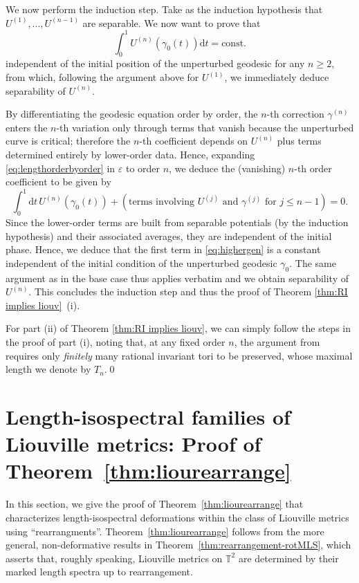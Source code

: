 \documentclass[11pt,letterpaper,oneside]{amsart}
\newcommand{\T}{\mathbb{T}}
\theoremstyle{definition}
\theoremstyle{remark}
\newcommand{\eps}{\varepsilon}
\newcommand{\const}{\text{const.}}
\theoremstyle{definition}
\theoremstyle{remark}
\newcommand{\dif}{\mathrm{d}}
\begin{document}
\medskip

We now perform the induction step. Take as the induction hypothesis that $U^{(1)}, ... , U^{(n-1)}$ are separable. We now want to prove that 
\begin{equation}     \label{eq:cancel}
   \int_0^1 U^{(n)}(\gamma_0(t)) \dif t = \const
\end{equation}
independent of the initial position of the unperturbed geodesic for any $n \ge 2$, from which, following the argument above for $U^{(1)}$, we immediately deduce separability of $U^{(n)}$.

\medskip

By differentiating the geodesic equation order by order, the $n$-th correction $\gamma^{(n)}$ enters the $n$-th variation only through terms that vanish because the unperturbed curve is critical; therefore the $n$-th coefficient depends on $U^{(n)}$
  plus terms determined entirely by lower-order data.
Hence, expanding \eqref{eq:lengthorderbyorder} in $\eps$ to order $n$, we deduce the (vanishing) $n$-th order coefficient to be given by
\begin{equation} \label{eq:highergen}
    \int_0^1 \dif t \, U^{(n)}(\gamma_0(t)) + (\text{terms involving } U^{(j)} \text{ and } \gamma^{(j)} \text{ for } j \le n-1)= 0. 
\end{equation}
Since the lower-order terms are built from separable potentials (by the induction hypothesis) and their associated averages, they are independent of the initial phase. Hence, we deduce that the first term in \eqref{eq:highergen} is a constant independent of the initial condition of the unperturbed geodesic $\gamma_0$. The same argument as in the base case thus applies verbatim and we obtain separability of $U^{(n)}$. This concludes the induction step and thus the proof of Theorem \ref{thm:RI implies liouv}~(i).

\medskip

For part (ii) of Theorem \ref{thm:RI implies liouv}, we can simply follow the steps in the proof of part (i), noting that, at any fixed order $n$, the argument from \cite{henheik2025deformational} requires only \emph{finitely} many rational invariant tori to be preserved, whose maximal length we denote by $T_n$.\qed




\section{Length-isospectral families of Liouville metrics: Proof of Theorem~\ref{thm:liourearrange}}
\label{sec:length-liouville}
In this section, we give the proof of Theorem~\ref{thm:liourearrange} that characterizes length-isospectral deformations within the class of Liouville metrics using ``rearrangments''.
Theorem~\ref{thm:liourearrange} follows from the more general, non-deformative results in Theorem~\ref{thm:rearrangement-rotMLS}, which asserts that, roughly speaking, Liouville metrics on $\T^2$ are determined by their marked length spectra up to rearrangement. 
\end{document}
